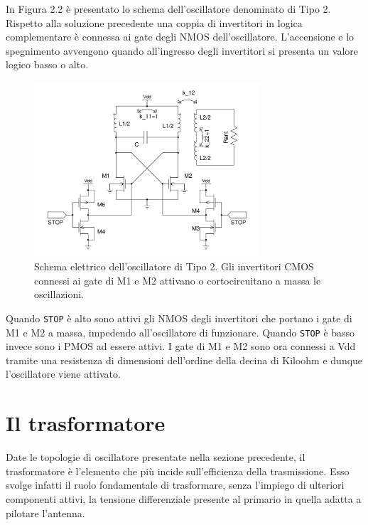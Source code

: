 \documentclass[a4paper, 12pt]{memoir}
\begin{document}
In Figura 2.2 è presentato lo schema dell'oscillatore denominato di Tipo 2.\\
Rispetto alla soluzione precedente una coppia di invertitori in logica
complementare è connessa ai gate degli NMOS dell'oscillatore. L'accensione e
lo spegnimento avvengono quando all'ingresso degli invertitori si presenta un
valore logico basso o alto.
\begin{figure}[h]
\centering
\includegraphics[width=0.75\textwidth]{images/tipo2.pdf}
\caption{Schema elettrico dell'oscillatore di Tipo 2. Gli invertitori CMOS
      connessi ai gate di M1 e M2 attivano o cortocircuitano a massa le
      oscillazioni.}
\end{figure}
\clearpage %
\noindent Quando \texttt{STOP} è alto sono attivi gli NMOS degli invertitori
che portano i gate di M1 e M2 a massa, impedendo all'oscillatore di funzionare.
Quando \texttt{STOP} è basso invece sono i PMOS ad essere attivi. I gate di M1
e M2 sono ora connessi a Vdd tramite una resistenza di dimensioni dell'ordine
della decina di Kiloohm e dunque l'oscillatore viene attivato.

\section{Il trasformatore}
Date le topologie di oscillatore presentate nella sezione precedente, il
trasformatore è l'elemento che più incide sull'efficienza della trasmissione.
Esso svolge infatti il ruolo fondamentale di trasformare, senza l'impiego di
ulteriori componenti attivi, la tensione differenziale presente al primario in
quella adatta a pilotare l'antenna\cite{Neviani14}.
\end{document}
